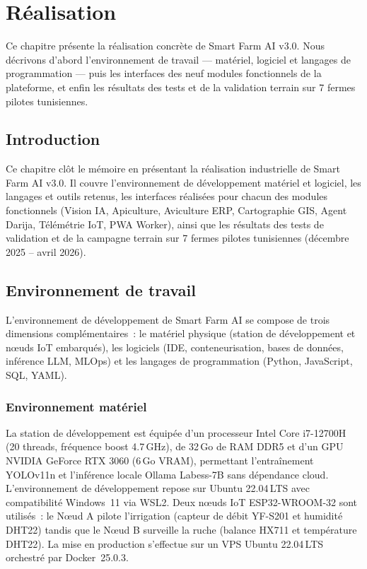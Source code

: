 \chapter{Réalisation}

Ce chapitre présente la réalisation concrète de Smart Farm AI v3.0.
Nous décrivons d'abord l'environnement de travail — matériel, logiciel et
langages de programmation — puis les interfaces des neuf modules fonctionnels
de la plateforme, et enfin les résultats des tests et de la validation terrain
sur 7 fermes pilotes tunisiennes.

\section{Introduction}

Ce chapitre clôt le mémoire en présentant la réalisation industrielle de
Smart Farm AI v3.0. Il couvre l'environnement de développement matériel et
logiciel, les langages et outils retenus, les interfaces réalisées pour
chacun des modules fonctionnels (Vision IA, Apiculture, Aviculture ERP,
Cartographie GIS, Agent Darija, Télémétrie IoT, PWA Worker), ainsi que les
résultats des tests de validation et de la campagne terrain sur
7 fermes pilotes tunisiennes (décembre 2025 -- avril 2026).

\section{Environnement de travail}

L'environnement de développement de Smart Farm AI se compose de trois
dimensions complémentaires~: le matériel physique (station de développement
et nœuds IoT embarqués), les logiciels (IDE, conteneurisation, bases de données,
inférence LLM, MLOps) et les langages de programmation (Python, JavaScript,
SQL, YAML).

\subsection{Environnement matériel}

La station de développement est équipée d'un processeur Intel Core i7-12700H
(20 threads, fréquence boost 4.7\,GHz), de 32\,Go de RAM DDR5 et d'un GPU
NVIDIA GeForce RTX 3060 (6\,Go VRAM), permettant l'entraînement YOLOv11n
et l'inférence locale Ollama Labess-7B sans dépendance cloud.
L'environnement de développement repose sur Ubuntu 22.04\,LTS avec
compatibilité Windows~11 via WSL2. Deux nœuds IoT ESP32-WROOM-32 sont
utilisés~: le Nœud A pilote l'irrigation (capteur de débit YF-S201 et
humidité DHT22) tandis que le Nœud B surveille la ruche (balance HX711
et température DHT22). La mise en production s'effectue sur un VPS
Ubuntu 22.04\,LTS orchestré par Docker~25.0.3.

